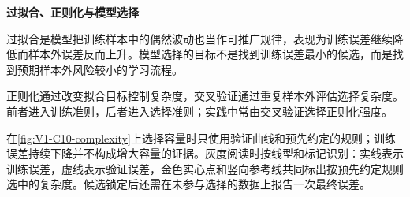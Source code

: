 \documentclass[UTF8,a4paper,11pt,openany]{ctexbook}
\begin{document}
\pagestyle{empty}
\setcounter{chapter}{10}
\setcounter{figure}{0}
\noindent\textbf{过拟合、正则化与模型选择}\par
\smallskip
过拟合是模型把训练样本中的偶然波动也当作可推广规律，表现为训练误差继续降低而样本外误差反而上升。模型选择的目标不是找到训练误差最小的候选，而是找到预期样本外风险较小的学习流程。

正则化通过改变拟合目标控制复杂度，交叉验证通过重复样本外评估选择复杂度。前者进入训练准则，后者进入选择准则；实践中常由交叉验证选择正则化强度。

\begingroup
{}

\endgroup
在\cref{fig:V1-C10-complexity}上选择容量时只使用验证曲线和预先约定的规则；训练误差持续下降并不构成增大容量的证据。灰度阅读时按线型和标记识别：实线表示训练误差，虚线表示验证误差，金色实心点和竖向参考线共同标出按预先约定规则选中的复杂度。候选锁定后还需在未参与选择的数据上报告一次最终误差。
\end{document}
